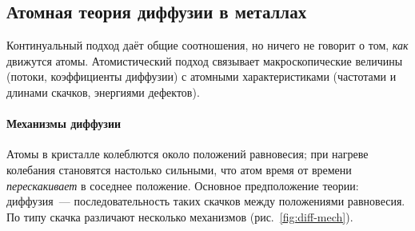 \subsection{Атомная теория диффузии в металлах}\label{ssec:diff-atomic}

Континуальный подход даёт общие соотношения, но ничего не говорит о
том, \emph{как} движутся атомы. Атомистический подход связывает
макроскопические величины (потоки, коэффициенты диффузии) с атомными
характеристиками (частотами и длинами скачков, энергиями дефектов).

\paragraph{Механизмы диффузии}
Атомы в кристалле колеблются около положений равновесия; при нагреве
колебания становятся настолько сильными, что атом время от времени
\emph{перескакивает} в соседнее положение. Основное предположение
теории: диффузия~— последовательность таких скачков между положениями
равновесия. По типу скачка различают несколько механизмов
(рис.~\ref{fig:diff-mech}).

